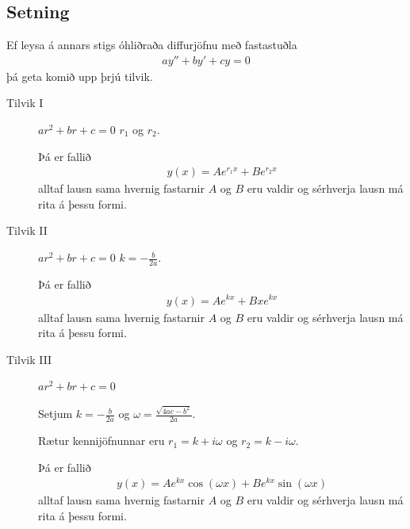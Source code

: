 \documentclass[a4paper,10pt,icelandic]{sphinxmanual}
\begin{document}
\subsection{Setning}
\label{\detokenize{kafli08:stigs-ohlidrud}}\label{\detokenize{kafli08:id3}}
Ef leysa á annars stigs óhliðraða diffurjöfnu með fastastuðla
\begin{equation*}
\begin{split}ay''+by'+cy=0\end{split}
\end{equation*}
þá geta komið upp þrjú tilvik.
\begin{description}
\item[{Tilvik I}] \leavevmode
{} \(ar^2+br+c=0\) 
\(r_1\) og \(r_2\).

Þá er fallið
\begin{equation*}
\begin{split}y(x)=Ae^{r_1x}+Be^{r_2x}\end{split}
\end{equation*}
alltaf lausn sama hvernig fastarnir \(A\) og \(B\) eru
valdir og sérhverja lausn má rita á þessu formi.

\item[{Tilvik II}] \leavevmode
{} \(ar^2+br+c=0\) 
\(k=-\frac{b}{2a}\).

Þá er fallið
\begin{equation*}
\begin{split}y(x)=Ae^{kx}+Bxe^{kx}\end{split}
\end{equation*}
alltaf lausn sama hvernig fastarnir \(A\) og \(B\) eru
valdir og sérhverja lausn má rita á þessu formi.

\item[{Tilvik III}] \leavevmode
{} \(ar^2+br+c=0\) 

Setjum \(k=-\frac{b}{2a}\) og
\(\omega=\frac{\sqrt{4ac-b^2}}{2a}\).

Rætur kennijöfnunnar eru \(r_1=k+i\omega\) og
\(r_2=k-i\omega\).

Þá er fallið
\begin{equation*}
\begin{split}y(x)=Ae^{kx}\cos(\omega x)+Be^{kx}\sin(\omega x)\end{split}
\end{equation*}
alltaf lausn sama hvernig fastarnir \(A\) og \(B\) eru
valdir og sérhverja lausn má rita á þessu formi.

\end{description}
\end{document}
